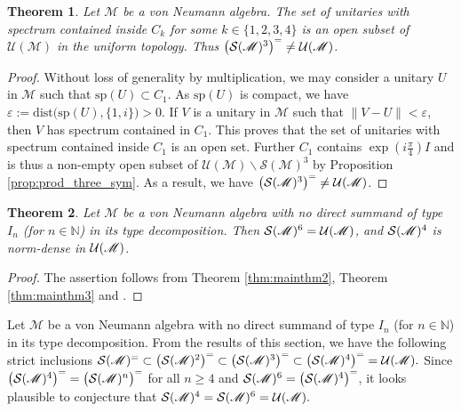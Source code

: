 \documentclass[12pt, preprint]{amsart}
\newtheorem{thm}{Theorem}[section]
\newcommand{\N}{\mathbb{N}}
\theoremstyle{definition}
\theoremstyle{remark}
\numberwithin{equation}{section}
\theoremstyle{ser}
\theoremstyle{serr}
\theoremstyle{ser}
\begin{document}
\begin{thm}
\label{thm:mainthm4}
\textsl{
Let $\mathscr{M}$ be a von Neumann algebra. The set of unitaries with spectrum contained inside $C_k$ for some $k \in \{ 1, 2, 3, 4 \}$ is an open subset of $\mathcal{U}(\mathscr{M})$ in the uniform topology. Thus $\big( \mathcal S (\mathscr{M})^3 \big)^{=} \ne \mathcal U (\mathscr{M})$.
}
\end{thm}
\begin{proof}
Without loss of generality by multiplication, we may consider a unitary $U$ in $\mathscr{M}$ such that $\mathrm{sp}(U) \subset C_1$. As $\mathrm{sp}(U)$ is compact, we have $\varepsilon := \mathrm{dist} \big( \mathrm{sp}(U), \{ 1, i \} \big) > 0$. If $V$ is a unitary in $\mathscr{M}$ such that $\| V - U \| < \varepsilon$, then $V$ has spectrum contained in $C_1$. This proves that the set of unitaries with spectrum contained inside $C_1$ is an open set. Further $C_1$ contains $\exp ( i \frac{\pi}{4} )I$ and is thus a non-empty open subset of $\mathcal{U}(\mathscr{M}) \backslash \mathcal{S}(\mathscr{M})^3 $ by Proposition \ref{prop:prod_three_sym}. As a result, we have $\big( \mathcal S (\mathscr{M})^3 \big)^{=} \ne \mathcal{U}(\mathscr{M})$.
\end{proof}



\begin{thm}
\textsl{
Let $\mathscr{M}$ be a von Neumann algebra with no direct summand of type $I_n$ (for $n \in \N$) in its type decomposition. Then $\mathcal S (\mathscr{M})^6 = \mathcal U (\mathscr{M})$, and $\mathcal S (\mathscr{M})^4$ is norm-dense in $\mathcal U (\mathscr{M})$.
}
\end{thm}
\begin{proof}
The assertion follows from Theorem \ref{thm:mainthm2}, Theorem \ref{thm:mainthm3} and \cite[pg. 900]{fillmore}.
\end{proof}

Let $\mathscr{M}$ be a von Neumann algebra with no direct summand of type $I_n$ (for $n \in \N$) in its type decomposition. From the results of this section, we have the following strict inclusions $\mathcal S (\mathscr{M})^{=} \subset \big( \mathcal S (\mathscr{M})^2 \big)^{=} \subset \big( \mathcal S (\mathscr{M})^3 \big)^{=} \subset \big( \mathcal S (\mathscr{M})^4 \big)^{=} = \mathcal U (\mathscr{M}).$ Since $\big( \mathcal S (\mathscr{M})^4 \big)^{=} = \big( \mathcal S (\mathscr{M})^n \big)^{=}$ for all $n \ge 4$ and $\mathcal S (\mathscr{M})^6 = \big( \mathcal S (\mathscr{M})^4 \big)^{=}$, it looks plausible to conjecture that $\mathcal S (\mathscr{M})^4 = \mathcal S (\mathscr{M})^6 = \mathcal U (\mathscr{M}). $
\end{document}
